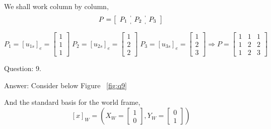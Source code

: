 \documentclass[a4paper]{article}
\begin{document}
\begin{qalist}
			We shall work column by column, 
			\renewcommand{\arraystretch}{1.5}
			\[P = \left[\begin{array}{c:c:c} {P}_{1} &  {P}_{2} & {P}_{3}\end{array}\right]\]
			
			\[{P}_{1} = {[{u}_{1s}]}_{e} = \begin{bmatrix}1 \\ 1 \\ 1\end{bmatrix} \;
			{P}_{2} = {[{u}_{2s}]}_{e} = \begin{bmatrix}1 \\ 2 \\ 2\end{bmatrix} \;
			{P}_{3} = {[{u}_{3s}]}_{e} = \begin{bmatrix}1 \\ 2 \\ 3\end{bmatrix} 
			\Rightarrow P = \begin{bmatrix} 1 & 1 & 1 \\ 1 & 2 & 2 \\ 1 & 2 & 3\end{bmatrix}\]
		
		\item[Question: 9.] \setcounter{equation}{0} 
		\item[Answer:]
			Consider below Figure ~\ref{fig:q9} \\
			\begin{minipage}{\linewidth}
				\vspace{0.5cm}
				\centering
				\label{fig:q9}
				\vspace{0.5cm}
			\end{minipage}
			And the standard basis for the world frame, 
			\begin{equation} {[x]}_{W} = 
				\left(
					{X}_{W} = \begin{bmatrix}1 \\ 0\end{bmatrix},
					{Y}_{W} = \begin{bmatrix}0 \\ 1\end{bmatrix}
				\right)
			\end{equation}
			

\end{qalist}
\end{document}
